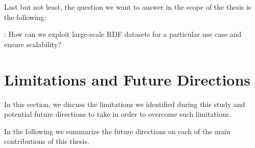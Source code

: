 Last but not least, the question we want to answer in the scope of the thesis is the following:

\begin{tcolorbox}
\textbf{\rqNr[RQ4]\label{rqc:4}}: How can we exploit large-scale RDF datasets for a particular use case and ensure scalability?
\end{tcolorbox}


\section{Limitations and Future Directions}
In this section, we discuss the limitations we identified during this study and potential future directions to take in order to overcome such limitations.

In the following we summarize the future directions on each of the main contributions of this thesis.

